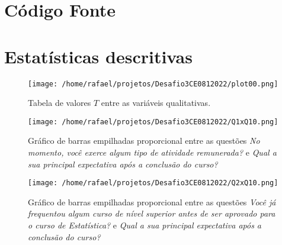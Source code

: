 \documentclass[
        a4paper,
        11pt,
        extrafontsizes,
        oneside,
        onecolumn,
        openright,
        final,
        article,
        brazil,
        sumario=tradicional
]{abntex2}
\begin{document}
\frenchspacing

\maketitle

\section{Código Fonte}



\section{Estatísticas descritivas}

\begin{figure}[htp]
\centering
\texttt{[image: /home/rafael/projetos/Desafio3CE0812022/plot00.png]}
\caption{Tabela de valores $T$ entre as variáveis qualitativas. }
\label{tabela}
\end{figure}

\begin{figure}[htp]
\centering
\texttt{[image: /home/rafael/projetos/Desafio3CE0812022/Q1xQ10.png]}
\caption{Gráfico de barras empilhadas proporcional entre as questões \emph{No momento, você exerce 
algum tipo de atividade remunerada?} e \emph{Qual a sua 
principal expectativa após a conclusão do curso?}}
\label{Q1xQ10}
\end{figure}

\begin{figure}[htp]
\centering
\texttt{[image: /home/rafael/projetos/Desafio3CE0812022/Q2xQ10.png]}
\caption{Gráfico de barras empilhadas proporcional entre as questões \emph{Você já frequentou 
algum curso de nível superior antes de ser aprovado para o curso de Estatística?} e \emph{Qual 
a sua principal expectativa após a conclusão do curso?}}
\label{Q5xQ6}
\end{figure}
\end{document}

